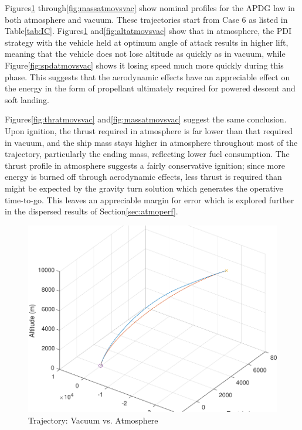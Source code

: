 Figures\:\ref{fig:trajatmovsvac} through\:\ref{fig:massatmovsvac} show nominal profiles for the APDG law in both atmosphere and vacuum. These trajectories start from Case 6 as listed in Table\:\ref{tab:IC}. Figures\:\ref{fig:trajatmovsvac} and\:\ref{fig:altatmovsvac} show that in atmosphere, the PDI strategy with the vehicle held at optimum angle of attack results in higher lift, meaning that the vehicle does not lose altitude as quickly as in vacuum, while Figure\:\ref{fig:spdatmovsvac} shows it losing speed much more quickly during this phase. This suggests that the aerodynamic effects have an appreciable effect on the energy in the form of propellant ultimately required for powered descent and soft landing. 

Figures\:\ref{fig:thratmovsvac} and\:\ref{fig:massatmovsvac} suggest the same conclusion. Upon ignition, the thrust required in atmosphere is far lower than that required in vacuum, and the ship mass stays higher in atmosphere throughout most of the trajectory, particularly the ending mass, reflecting lower fuel consumption. The thrust profile in atmosphere suggests a fairly conservative ignition; since more energy is burned off through aerodynamic effects, less thrust is required than might be expected by the gravity turn solution which generates the operative time-to-go. This leaves an appreciable margin for error which is explored further in the dispersed results of Section\:\ref{sec:atmoperf}.


\begin{figure}[H]
	\centering
	\begin{minipage}{4.3 in}
		\includegraphics[width=\linewidth]{Figures/trajatmovsvac.pdf}
		\caption{Trajectory: Vacuum vs. Atmosphere \label{fig:trajatmovsvac} }
	\end{minipage}
\end{figure}

